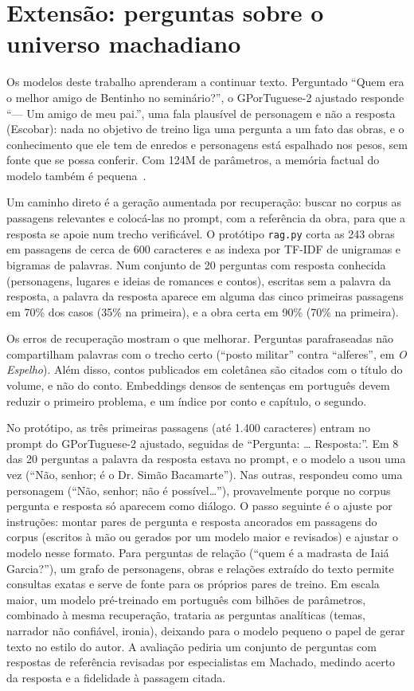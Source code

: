 \documentclass[conference]{IEEEtran}
\begin{document}
\section{Extensão: perguntas sobre o universo machadiano}

Os modelos deste trabalho aprenderam a continuar texto. Perguntado ``Quem era o melhor amigo de Bentinho no seminário?'', o GPorTuguese-2 ajustado responde ``--- Um amigo de meu pai.'', uma fala plausível de personagem e não a resposta (Escobar): nada no objetivo de treino liga uma pergunta a um fato das obras, e o conhecimento que ele tem de enredos e personagens está espalhado nos pesos, sem fonte que se possa conferir. Com 124M de parâmetros, a memória factual do modelo também é pequena~\cite{brown2020gpt3}.

Um caminho direto é a geração aumentada por recuperação: buscar no corpus as passagens relevantes e colocá-las no prompt, com a referência da obra, para que a resposta se apoie num trecho verificável. O protótipo \texttt{rag.py} corta as 243 obras em passagens de cerca de 600 caracteres e as indexa por TF-IDF de unigramas e bigramas de palavras. Num conjunto de 20 perguntas com resposta conhecida (personagens, lugares e ideias de romances e contos), escritas sem a palavra da resposta, a palavra da resposta aparece em alguma das cinco primeiras passagens em 70\% dos casos (35\% na primeira), e a obra certa em 90\% (70\% na primeira).

Os erros de recuperação mostram o que melhorar. Perguntas parafraseadas não compartilham palavras com o trecho certo (``posto militar'' contra ``alferes'', em \emph{O Espelho}). Além disso, contos publicados em coletânea são citados com o título do volume, e não do conto. Embeddings densos de sentenças em português devem reduzir o primeiro problema, e um índice por conto e capítulo, o segundo.

No protótipo, as três primeiras passagens (até 1.400 caracteres) entram no prompt do GPorTuguese-2 ajustado, seguidas de ``Pergunta: \ldots{} Resposta:''. Em 8 das 20 perguntas a palavra da resposta estava no prompt, e o modelo a usou uma vez (``Não, senhor; é o Dr. Simão Bacamarte''). Nas outras, respondeu como uma personagem (``Não, senhor; não é possível\ldots''), provavelmente porque no corpus pergunta e resposta só aparecem como diálogo. O passo seguinte é o ajuste por instruções: montar pares de pergunta e resposta ancorados em passagens do corpus (escritos à mão ou gerados por um modelo maior e revisados) e ajustar o modelo nesse formato. Para perguntas de relação (``quem é a madrasta de Iaiá Garcia?''), um grafo de personagens, obras e relações extraído do texto permite consultas exatas e serve de fonte para os próprios pares de treino. Em escala maior, um modelo pré-treinado em português com bilhões de parâmetros, combinado à mesma recuperação, trataria as perguntas analíticas (temas, narrador não confiável, ironia), deixando para o modelo pequeno o papel de gerar texto no estilo do autor. A avaliação pediria um conjunto de perguntas com respostas de referência revisadas por especialistas em Machado, medindo acerto da resposta e a fidelidade à passagem citada.
\end{document}
